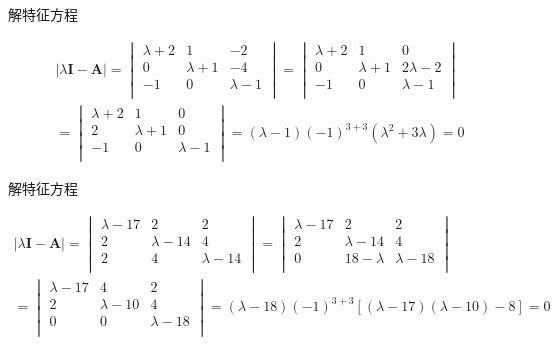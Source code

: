 \begin{examp}{解特征方程}

    \jie 
    \begin{gather*}
        \vert \lambda \mathbf{I}-\mathbf{A} \vert=
        \begin{vmatrix}
            \lambda+2   &   1   &   -2\\
            0   &   \lambda+1   &   -4\\
            -1   &   0   &   \lambda-1\\
        \end{vmatrix}=
    \begin{vmatrix}
        \lambda+2   &   1   &   0   \\
    0   &   \lambda+1   &   2\lambda-2  \\
    -1  &   0   &   \lambda-1   \\
    \end{vmatrix} \\
    =\begin{vmatrix}
        \lambda+2   &   1   &   0   \\
        2   &   \lambda+1   &   0   \\
        -1  &   0   &   \lambda-1   \\    
    \end{vmatrix}=(\lambda-1)(-1)^{3+3}(\lambda^2+3\lambda)=0
    \end{gather*}
\end{examp}

\begin{examp}{解特征方程}

    \jie 
    \begin{gather*}
        \vert \lambda \mathbf{I}-\mathbf{A} \vert=
        \begin{vmatrix}
            \lambda-17  &   2   &   2   \\
            2   &   \lambda-14  &   4   \\
            2   &   4   &   \lambda-14  \\        
        \end{vmatrix}=
    \begin{vmatrix}
        \lambda-17  &   2   &   2   \\
        2   &   \lambda-14  &   4   \\
        0   &   18-\lambda  &   \lambda-18  \\    
    \end{vmatrix} \\
    =\begin{vmatrix}
        \lambda-17  &   4   &   2   \\
        2   &   \lambda-10  &   4   \\
        0   &   0   &   \lambda-18  \\       
    \end{vmatrix}=(\lambda-18)(-1)^{3+3}\left[(\lambda-17)(\lambda-10)-8\right] =0
    \end{gather*}
\end{examp}

